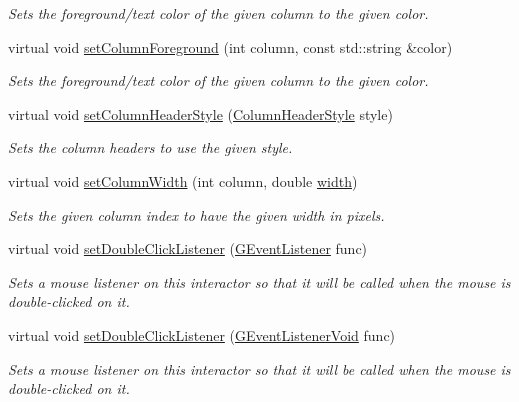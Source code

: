 \begin{DoxyCompactItemize}
\begin{DoxyCompactList}\small\item\em Sets the foreground/text color of the given column to the given color. \end{DoxyCompactList}\item 
virtual void \mbox{\hyperlink{classsgl_1_1GTable_a84ca08c2995646ab28c78bffbcdc2693}{set\+Column\+Foreground}} (int column, const std\+::string \&color)
\begin{DoxyCompactList}\small\item\em Sets the foreground/text color of the given column to the given color. \end{DoxyCompactList}\item 
virtual void \mbox{\hyperlink{classsgl_1_1GTable_ac97cb91256925fa81c52594bca854969}{set\+Column\+Header\+Style}} (\mbox{\hyperlink{classsgl_1_1GTable_a060cff504451bbb98530e64e936e2671}{Column\+Header\+Style}} style)
\begin{DoxyCompactList}\small\item\em Sets the column headers to use the given style. \end{DoxyCompactList}\item 
virtual void \mbox{\hyperlink{classsgl_1_1GTable_a52075dc231c73a896bcef426047fd327}{set\+Column\+Width}} (int column, double \mbox{\hyperlink{classsgl_1_1GTable_ad72663daf610f2a0833a2fc3d78e4fdf}{width}})
\begin{DoxyCompactList}\small\item\em Sets the given column index to have the given width in pixels. \end{DoxyCompactList}\item 
virtual void \mbox{\hyperlink{classsgl_1_1GInteractor_ac29f9a3462458e165fae3a1f046ee77a}{set\+Double\+Click\+Listener}} (\mbox{\hyperlink{namespacesgl_ae9f3e9eab70035da1a2b114e21357b25}{G\+Event\+Listener}} func)
\begin{DoxyCompactList}\small\item\em Sets a mouse listener on this interactor so that it will be called when the mouse is double-\/clicked on it. \end{DoxyCompactList}\item 
virtual void \mbox{\hyperlink{classsgl_1_1GInteractor_a50096194d66f48c92dd4c512d41bfc76}{set\+Double\+Click\+Listener}} (\mbox{\hyperlink{namespacesgl_a54427ce97bb1c2804e4fe2b0a62e8b17}{G\+Event\+Listener\+Void}} func)
\begin{DoxyCompactList}\small\item\em Sets a mouse listener on this interactor so that it will be called when the mouse is double-\/clicked on it. \end{DoxyCompactList}\item 

\end{DoxyCompactItemize}
